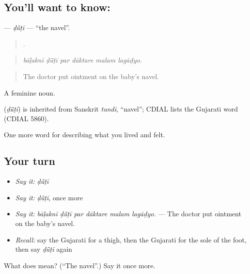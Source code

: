 \subsection*{You'll want to know: }
\textbf{} — \emph{ḍū̃ṭī} — \textquotedblleft{}the navel\textquotedblright{}.

\begin{quote}
     .
\end{quote}

\begin{quote}
\emph{bāḷaknī ḍū̃ṭī par dāktare malam lagāḍyo.}
\end{quote}

\begin{quote}
The doctor put ointment on the baby's navel.
\end{quote}

A feminine noun.

\begin{cousinweb}
\textbf{} (\emph{ḍū̃ṭī}) is inherited from Sanskrit \emph{tundi}, \textquotedblleft{}navel\textquotedblright{}; CDIAL lists the Gujarati word (CDIAL 5860).
\end{cousinweb}

\begin{grammarlens}[title={What you've built}]
One more word for describing what you lived and felt.
\end{grammarlens}

\subsection*{Your turn}
\begin{itemize}
\raggedright
  \item \emph{Say it:} \emph{ḍū̃ṭī}
  \item \emph{Say it:} \emph{ḍū̃ṭī}, once more
  \item \emph{Say it:} \emph{bāḷaknī ḍū̃ṭī par dāktare malam lagāḍyo.} — The doctor put ointment on the baby's navel.
  \item \emph{Recall:} say the Gujarati for a thigh, then the Gujarati for the sole of the foot, then say \emph{ḍū̃ṭī} again
\end{itemize}

\begin{tcolorbox}[breakable,colback=teal!4,colframe=teal!35!black,title={Before you move on}]
What does  mean? (\textquotedblleft{}The navel\textquotedblright{}.) Say it once more.
\end{tcolorbox}
